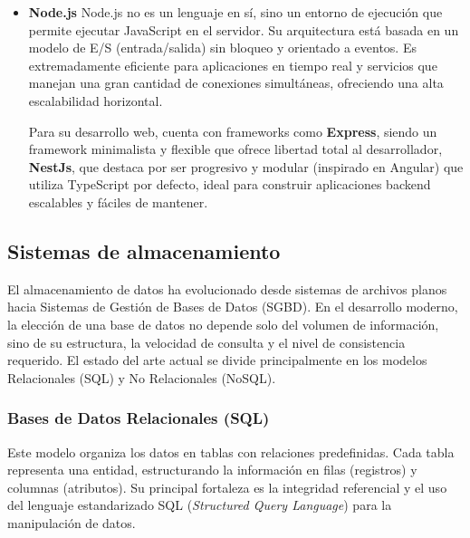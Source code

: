\begin{itemize}
    Por otro lado, FastApi \cite{fastapi}, siendo una opción moderna y de alto rendimiento basada en el tipado de Python. 
    Destaca por la generación automática de documentación técnica (OpenAPI/Swagger) y su soporte nativo para programación 
    asíncrona, lo que lo hace ideal para APIs de baja latencia.

    \item \textbf{Node.js} \cite{nodeJs}
    \newline
    Node.js no es un lenguaje en sí, sino un entorno de ejecución que permite ejecutar JavaScript en el servidor. Su 
    arquitectura está basada en un modelo de E/S (entrada/salida) sin bloqueo y orientado a eventos. Es extremadamente 
    eficiente para aplicaciones en tiempo real y servicios que manejan una gran cantidad de conexiones simultáneas, 
    ofreciendo una alta escalabilidad horizontal.

    Para su desarrollo web, cuenta con frameworks como \textbf{Express}, siendo un framework minimalista y flexible que 
    ofrece libertad total al desarrollador, \textbf{NestJs}, que destaca por ser progresivo y modular (inspirado en Angular) 
    que utiliza TypeScript por defecto, ideal para construir aplicaciones backend escalables y fáciles de mantener.
\end{itemize}

\subsection{Sistemas de almacenamiento}

El almacenamiento de datos ha evolucionado desde sistemas de archivos planos hacia Sistemas de Gestión de Bases de 
Datos (SGBD). En el desarrollo moderno, la elección de una base de datos no depende solo del volumen de información, 
sino de su estructura, la velocidad de consulta y el nivel de consistencia requerido. El estado del arte actual se 
divide principalmente en los modelos Relacionales (SQL) y No Relacionales (NoSQL).

\subsubsection{Bases de Datos Relacionales (SQL) \cite{baseDatosSQL}} 

Este modelo organiza los datos en tablas con relaciones predefinidas. Cada tabla representa una entidad, estructurando 
la información en filas (registros) y columnas (atributos). Su principal fortaleza es la integridad referencial y el 
uso del lenguaje estandarizado SQL (\textit{Structured Query Language}) para la manipulación de datos.


